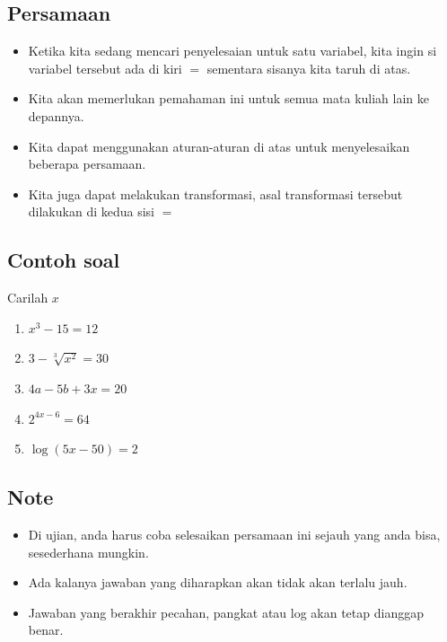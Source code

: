 \documentclass[
  letterpaper,
  DIV=11,
  numbers=noendperiod]{scrartcl}
\begin{document}
\hypertarget{persamaan}{%
\subsection{Persamaan}\label{persamaan}}

\begin{itemize}
\item
  Ketika kita sedang mencari penyelesaian untuk satu variabel, kita
  ingin si variabel tersebut ada di kiri \(=\) sementara sisanya kita
  taruh di atas.
\item
  Kita akan memerlukan pemahaman ini untuk semua mata kuliah lain ke
  depannya.
\item
  Kita dapat menggunakan aturan-aturan di atas untuk menyelesaikan
  beberapa persamaan.
\item
  Kita juga dapat melakukan transformasi, asal transformasi tersebut
  dilakukan di kedua sisi \(=\)
\end{itemize}

\hypertarget{contoh-soal}{%
\subsection{Contoh soal}\label{contoh-soal}}

Carilah \(x\)

\begin{enumerate}
\def\labelenumi{\arabic{enumi}.}
\item
  \(x^3-15=12\)
\item
  \(3-\sqrt[3]{x^2}=30\)
\item
  \(4a-5b+3x=20\)
\item
  \(2^{4x-6}=64\)
\item
  \(\log (5x-50)=2\)
\end{enumerate}

\hypertarget{note}{%
\subsection{Note}\label{note}}

\begin{itemize}
\item
  Di ujian, anda harus coba selesaikan persamaan ini sejauh yang anda
  bisa, sesederhana mungkin.
\item
  Ada kalanya jawaban yang diharapkan akan tidak akan terlalu jauh.
\item
  Jawaban yang berakhir pecahan, pangkat atau log akan tetap dianggap
  benar.
\end{itemize}
\end{document}
